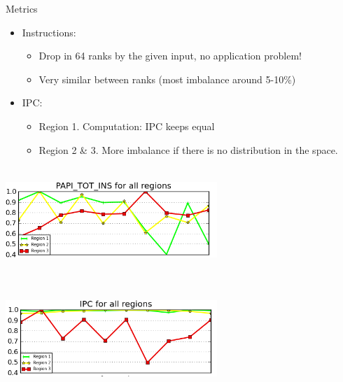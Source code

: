 \documentclass[aspectratio=169]{bredelebeamer}
\begin{document}
\begin{frame}{Metrics}
\begin{itemize}
\item Instructions:
	\begin{itemize}
		\item Drop in 64 ranks by the given input, no application problem!
		\item Very similar between ranks (most imbalance around 5-10\%)
	\end{itemize}
\item IPC:
	\begin{itemize}
		\item Region 1. Computation: IPC keeps equal
		\item Region 2 \& 3. More imbalance if there is no distribution in the space.
	\end{itemize}
\end{itemize}
\centering
\includegraphics[width=8cm, height=4cm, keepaspectratio]{"./img/tracking/instr_all_regions"}


\centering
\includegraphics[width=8cm, height=4cm, keepaspectratio]{"./img/tracking/IPC_all_regions"}



\end{frame}
\end{document}
